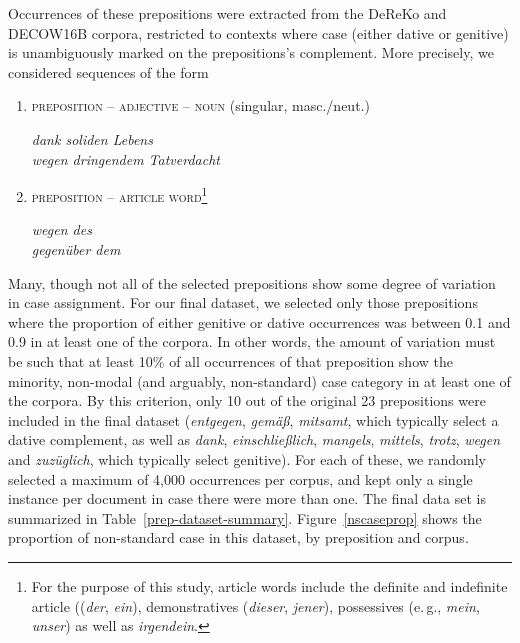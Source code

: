 Occurrences of these prepositions were extracted from the DeReKo and DECOW16B corpora, restricted to contexts where case (either dative or genitive) is unambiguously marked on the prepositions's complement.
 More precisely, we considered sequences of the form 
 
 \begin{enumerate}
  \item \textsc{preposition} -- \textsc{adjective} -- \textsc{noun} (singular, masc./neut.)\\
      \begin{small}
      \emph{dank soliden Lebens}\\
      \emph{wegen dringendem Tatverdacht}
      \end{small}
  
  \item \textsc{preposition} -- \textsc{article word}\footnote{For the purpose of this study, article words include the definite  and indefinite article ((\emph{der}, \emph{ein}), demonstratives (\emph{dieser}, \emph{jener}), possessives (e.\,g., \emph{mein}, \emph{unser}) as well as \emph{irgendein}.}\\
      \begin{small}
      \emph{wegen des}\\
      \emph{gegenüber dem}
      \end{small}

\end{enumerate}

 
Many, though not all of the selected prepositions show some degree of variation in case assignment.
For our final dataset, we selected only those prepositions where the proportion of either genitive or dative occurrences was between 0.1 and 0.9 in at least one of the corpora.
In other words, the amount of variation must be such that at least 10\% of all occurrences of that preposition show the minority, non-modal (and arguably, non-standard) case category in at least one of the corpora.
By this criterion, only 10 out of the original 23 prepositions were included in the final dataset (\textit{entgegen}, \textit{gem\"a\ss}, \textit{mitsamt}, which typically select a dative complement, as well as \textit{dank}, \textit{einschlie{\ss}lich}, \textit{mangels}, \textit{mittels}, \textit{trotz}, \textit{wegen} and \textit{zuz\"uglich}, which typically select genitive).
For each of these, we randomly selected a maximum of 4,000 occurrences per corpus, and kept only a single instance per document in case there were more than one. The final data set is summarized in Table~\ref{prep-dataset-summary}. Figure~\ref{nscaseprop} shows the proportion of non-standard case in this dataset, by preposition and corpus.

